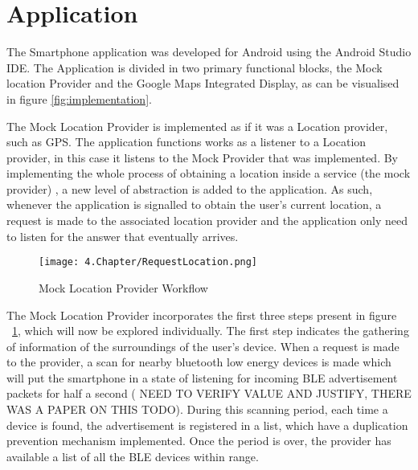 \section{Application}
\label{sec:app}


The Smartphone application was developed for Android using the Android Studio IDE. The Application is divided in two primary functional blocks, the Mock location Provider and the Google Maps Integrated Display, as can be visualised in figure \ref{fig:implementation}.

The Mock Location Provider is implemented as if it was a Location provider, such as GPS. The application functions works as a listener to a Location provider, in this case it listens to the Mock Provider that was implemented. By implementing the whole process of obtaining a location inside a service (the mock provider) , a new level of abstraction is added to the application. As such, whenever the application is signalled to obtain the user's current location, a request is made to the associated location provider and the application only need to listen for the answer that eventually arrives.

\begin{figure}
	\centering
		\texttt{[image: 4.Chapter/RequestLocation.png]}
	\caption[Mock Location Provider Workflow]{Mock Location Provider Workflow}
	\label{fig:MockProvider}
\end{figure}

The Mock Location Provider incorporates the first three steps present in figure ~\ref{fig:MockProvider}, which will now be explored individually. The first step indicates the gathering of information of the surroundings of the user's device. When a request is made to the provider, a scan for nearby bluetooth low energy devices is made which will put the smartphone in a state of listening for incoming \ac{BLE} advertisement packets for half a second ( NEED TO VERIFY VALUE AND JUSTIFY, THERE WAS A PAPER ON THIS TODO). During this scanning period, each time a device is found, the advertisement is registered in a list, which have a duplication prevention mechanism implemented. Once the period is over, the provider has available a list of all the \ac{BLE} devices within range.   

